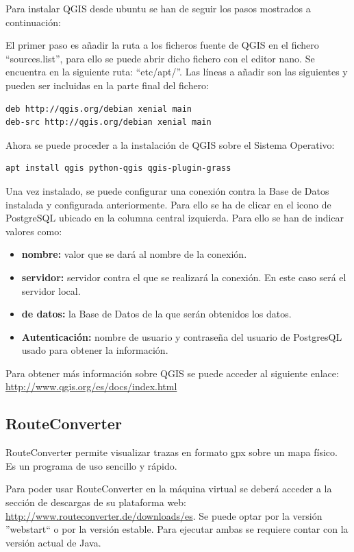 Para instalar QGIS desde ubuntu se han de seguir los pasos mostrados a continuación:

El primer paso es añadir la ruta a los ficheros fuente de QGIS en el fichero ``sources.list'', para ello se puede abrir dicho fichero con el editor nano. Se encuentra en la siguiente ruta: ``etc/apt/''.
Las líneas a añadir son las siguientes y pueden ser incluidas en la parte final del fichero:
\begin{lstlisting}
deb http://qgis.org/debian xenial main
deb-src http://qgis.org/debian xenial main
\end{lstlisting}

Ahora se puede proceder a la instalación de QGIS sobre el Sistema Operativo:

\begin{lstlisting}
apt install qgis python-qgis qgis-plugin-grass
\end{lstlisting}

Una vez instalado, se puede configurar una conexión contra la Base de Datos instalada y configurada anteriormente. Para ello se ha de clicar en el icono de PostgreSQL ubicado en la columna central izquierda. Para ello se han de indicar valores como:

\begin{itemize}
\item \textbf{nombre:} valor que se dará al nombre de la conexión.
\item \textbf{servidor:} servidor contra el que se realizará la conexión. En este caso será el servidor local.
\item \textbf{ de datos:} la Base de Datos de la que serán obtenidos los datos.
\item \textbf{Autenticación:} nombre de usuario y contraseña  del usuario de PostgresQL usado para obtener la información.
\end{itemize}

Para obtener más información sobre QGIS se puede acceder al siguiente enlace: \url{http://www.qgis.org/es/docs/index.html}

\subsection{RouteConverter}
RouteConverter permite visualizar trazas en formato gpx sobre un mapa físico. Es un programa de uso sencillo y rápido.

Para poder usar RouteConverter en la máquina virtual se deberá acceder a la sección de descargas de su plataforma web: \url{http://www.routeconverter.de/downloads/es}. Se puede optar por la versión ''webstart`` o por la versión estable. Para ejecutar ambas se requiere contar con la versión actual de Java.


